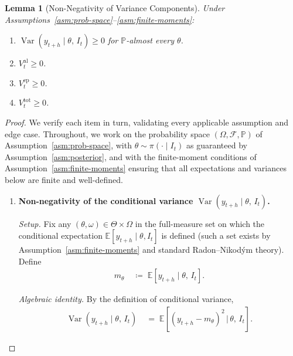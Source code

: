 \documentclass[12pt,openany]{book}
\newcommand{\calF}{\mathcal{F}}
\newcommand{\calI}{\mathcal{I}}
\newcommand{\E}{\mathbb{E}}
\numberwithin{equation}{chapter}
\theoremstyle{plain}
\newtheorem{lemma}[theorem]{Lemma}
\theoremstyle{definition}
\theoremstyle{remark}
\numberwithin{equation}{chapter}
\theoremstyle{plain}
\DeclareMathOperator{\Var}{Var}
\def\calI{I}%
\begin{document}
\begin{lemma}[Non-Negativity of Variance Components]
\label{lem:nonneg}
Under Assumptions~\ref{asm:prob-space}--\ref{asm:finite-moments}:
\begin{enumerate}
  \item $\Var(y_{t+h} \mid \theta,\, \calI_t) \geq 0$
        for $\mathbb{P}$-almost every $\theta$.
  \item $V^{\mathrm{al}}_t \geq 0$.
  \item $V^{\mathrm{ep}}_t \geq 0$.
  \item $V^{\mathrm{tot}}_t \geq 0$.
\end{enumerate}
\end{lemma}

\begin{proof}
We verify each item in turn, validating every applicable assumption
and edge case.  Throughout, we work on the probability space
$(\Omega, \calF, \mathbb{P})$ of
Assumption~\ref{asm:prob-space}, with $\theta \sim \pi(\cdot \mid
\calI_t)$ as guaranteed by Assumption~\ref{asm:posterior}, and with
the finite-moment conditions of Assumption~\ref{asm:finite-moments}
ensuring that all expectations and variances below are finite and
well-defined.

\begin{enumerate}

  \item \textbf{Non-negativity of the conditional variance
        $\Var(y_{t+h} \mid \theta,\, \calI_t)$.}

        \noindent\textit{Setup.}
        Fix any $(\theta, \omega) \in \Theta \times \Omega$ in the
        full-measure set on which the conditional expectation
        $\E[y_{t+h} \mid \theta, \calI_t]$ is defined (such a set
        exists by Assumption~\ref{asm:finite-moments} and standard
        Radon--Nikod\'{y}m theory).  Define
        \begin{align}
          m_\theta
          &\;\coloneqq\;
            \E\!\left[y_{t+h} \mid \theta,\, \calI_t\right].
          \label{eq:mtheta-def}
        \end{align}

        \noindent\textit{Algebraic identity.}
        By the definition of conditional variance,
        \begin{align}
          \Var(y_{t+h} \mid \theta,\, \calI_t)
          &\;=\;
            \E\!\left[
              \left(y_{t+h} - m_\theta\right)^{\!2}
            \,\Big|\,
              \theta,\, \calI_t
            \right].
          \label{eq:condvar-sq}
        \end{align}


\end{enumerate}
\end{proof}
\end{document}
